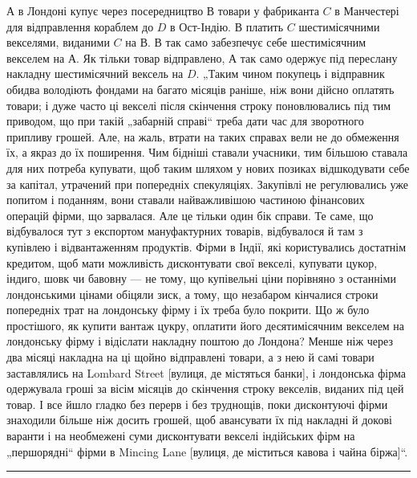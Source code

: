 $А$ в Лондоні купує через посередництво $В$ товари у фабриканта $C$ в Манчестері для відправлення кораблем
до $D$ в Ост-Індію. $В$ платить $C$ шестимісячними векселями, виданими $C$ на $В$. В так само забезпечує себе
шестимісячним
векселем на $А$. Як тільки товар відправлено, $А$ так само одержує під переслану
накладну шестимісячний вексель на $D$. „Таким чином покупець і відправник
обидва володіють фондами на багато місяців раніше, ніж вони дійсно оплатять
товари; і дуже часто ці векселі після скінчення строку поновлювались під тим
приводом, що при такій „забарній справі“ треба дати час для зворотного припливу грошей. Але, на
жаль, втрати на таких справах вели не до обмеження
їх, а якраз до їх поширення. Чим бідніші ставали учасники, тим більшою ставала для них потреба
купувати, щоб таким шляхом у нових позиках відшкодувати
себе за капітал, утрачений при попередніх спекуляціях. Закупівлі не регулювались уже попитом і
поданням, вони ставали найважливішою частиною фінансових
операцій фірми, що зарвалася. Але це тільки один бік справи. Те саме, що відбувалося тут з експортом
мануфактурних товарів, відбувалося й там з купівлею
і відвантаженням продуктів. Фірми в Індії, які користувались достатнім кредитом,
щоб мати можливість дисконтувати свої векселі, купувати цукор, індиго, шовк
чи бавовну — не тому, що купівельні ціни порівняно з останніми лондонськими
цінами обіцяли зиск, а тому, що незабаром кінчалися строки попередніх трат на
лондонську фірму і їх треба було покрити. Що ж було простішого, як купити вантаж цукру, оплатити
його десятимісячним векселем на лондонську фірму і відіслати накладну поштою до Лондона? Менше ніж
через два місяці накладна на
ці щойно відправлені товари, а з нею й самі товари заставлялись на Lombard
Street [вулиця, де містяться банки], і лондонська фірма одержувала гроші за
вісім місяців до скінчення строку векселів, виданих під цей товар. І все йшло
гладко без перерв і без труднощів, поки дисконтуючі фірми знаходили більше
ніж досить грошей, щоб авансувати їх під накладні й докові варанти і на необмежені суми дисконтувати
векселі індійських фірм на „першорядні“ фірми в
Mincing Lane [вулиця, де міститься кавова і чайна біржа]“.

\pfbreak
